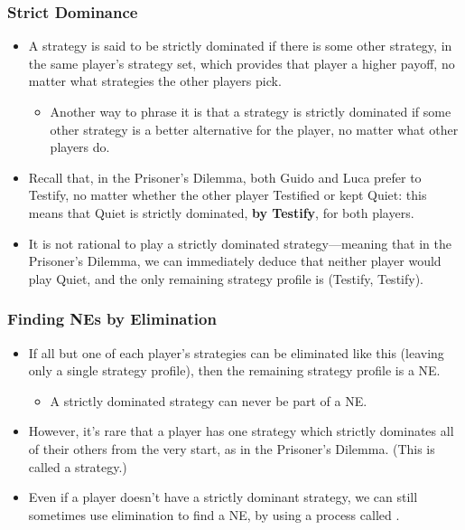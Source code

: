 \begin{frame}
\frametitle{Strict Dominance}
\begin{itemize}
	\item A strategy is said to be strictly dominated if there is some other strategy, in the same player's strategy set, which provides that player a higher payoff, no matter what strategies the other players pick.
	\begin{itemize}
		\item Another way to phrase it is that a strategy is strictly dominated if some other strategy is a better alternative for the player, no matter what other players do.
	\end{itemize}
	\item Recall that, in the Prisoner's Dilemma, both Guido and Luca prefer to Testify, no matter whether the other player Testified or kept Quiet: this means that Quiet is strictly dominated, \textbf{by Testify}, for both players.
	\item It is not rational to play a strictly dominated strategy---meaning that in the Prisoner's Dilemma, we can immediately deduce that neither player would play Quiet, and the only remaining strategy profile is (Testify, Testify).
\end{itemize}
\end{frame}

\begin{frame}
\frametitle{Finding NEs by Elimination}
\begin{itemize}
	\item If all but one of each player's strategies can be eliminated like this (leaving only a single strategy profile), then the remaining strategy profile is a NE.
	\begin{itemize}
		\item A strictly dominated strategy can never be part of a NE.
	\end{itemize}
	\item However, it's rare that a player has one strategy which strictly dominates all of their others from the very start, as in the Prisoner's Dilemma. (This is called a  strategy.) 
	\item Even if a player doesn't have a strictly dominant strategy, we can still sometimes use elimination to find a NE, by using a process called .
\end{itemize}
\end{frame}

